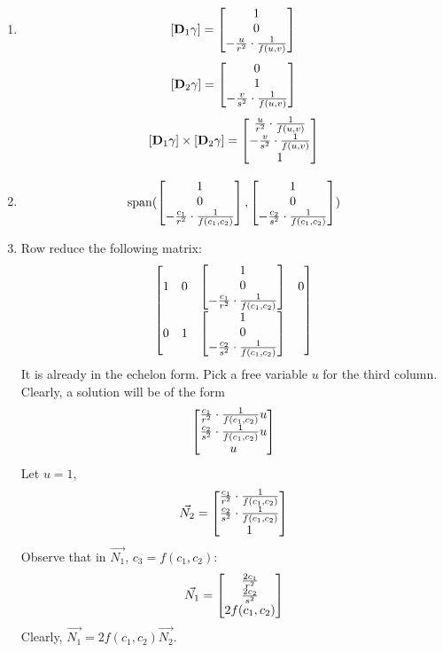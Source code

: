 \documentclass{homework}
\begin{document}
\begin{problem}{3}
\begin{enumerate}
\item
$$[\mathbf{D}_1\gamma] = \begin{bmatrix}1\\0\\
-\frac{u}{r^2}\cdot\frac{1}{f(u, v)}\end{bmatrix}$$
$$[\mathbf{D}_2\gamma] = \begin{bmatrix}0\\1\\
-\frac{v}{s^2}\cdot\frac{1}{f(u, v)}\end{bmatrix}$$
$$[\mathbf{D}_1\gamma] \times [\mathbf{D}_2\gamma] =
\begin{bmatrix}
 \frac{u}{r^2}\cdot\frac{1}{f(u, v)}\\
-\frac{v}{s^2}\cdot\frac{1}{f(u, v)}\\
 1\end{bmatrix}$$

\item
$$\operatorname{span}(
\begin{bmatrix}1\\0\\-\frac{c_1}{r^2}\cdot\frac{1}{f(c_1, c_2)}\end{bmatrix},
\begin{bmatrix}1\\0\\-\frac{c_2}{s^2}\cdot\frac{1}{f(c_1, c_2)}\end{bmatrix})$$

\item
Row reduce the following matrix:
$$\begin{bmatrix}
1 & 0 & \begin{bmatrix}1\\0\\-\frac{c_1}{r^2}\cdot\frac{1}{f(c_1, c_2)}\end{bmatrix} & 0\\
0 & 1 & \begin{bmatrix}1\\0\\-\frac{c_2}{s^2}\cdot\frac{1}{f(c_1, c_2)}\end{bmatrix}\end{bmatrix}$$
It is already in the echelon form. Pick a free variable $u$ for the third
column. Clearly, a solution will be of the form
$$\begin{bmatrix}
\frac{c_1}{r^2}\cdot\frac{1}{f(c_1, c_2)}u\\
\frac{c_2}{s^2}\cdot\frac{1}{f(c_1, c_2)}u\\
u\end{bmatrix}$$
Let $u = 1$,
$$\vec{N_2} = \begin{bmatrix}
\frac{c_1}{r^2}\cdot\frac{1}{f(c_1, c_2)}\\
\frac{c_2}{s^2}\cdot\frac{1}{f(c_1, c_2)}\\
1\end{bmatrix}$$
Observe that in $\vec{N_1}$, $c_3 = f(c_1, c_2)$:
$$\vec{N_1} = \begin{bmatrix}\frac{2c_1}{r^2}\\\frac{2c_2}{s^2}\\2f(c_1, c_2)\end{bmatrix}$$
Clearly, $\vec{N_1} = 2f(c_1, c_2)\vec{N_2}$. \QED
\end{enumerate}
\end{problem}
\end{document}
